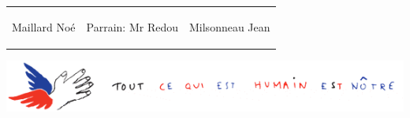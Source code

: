 \documentclass[a4paper, 12pt]{article}
\begin{document}
\begin{center}
\vskip2cm
\begin{tabular}{p{4cm} p{4cm} p{4cm}}
\begin{center}Maillard Noé\end{center} 
&
\begin{center}Parrain: Mr Redou\end{center}
&
\begin{center}Milsonneau Jean\end{center}
\end{tabular}
\end{center}

\includegraphics[width=16cm]{banner.png}
\end{document}
